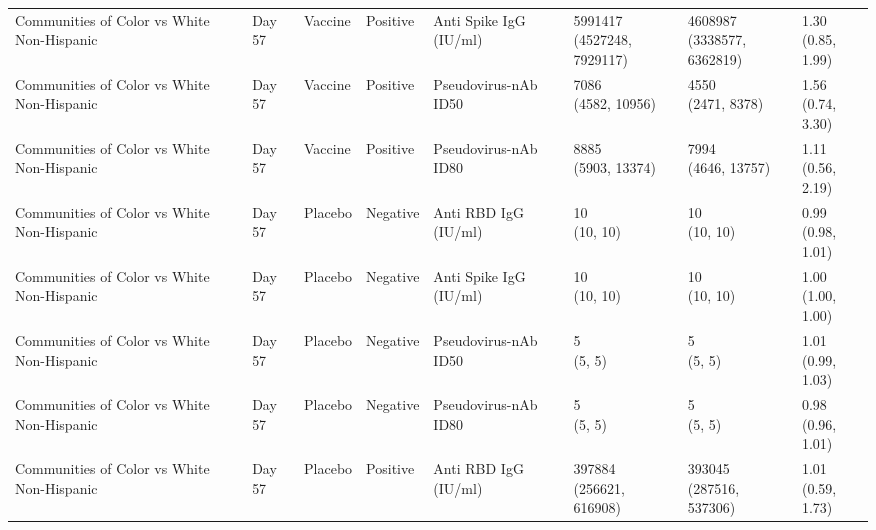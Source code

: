\documentclass[]{book}
\theoremstyle{definition}
\theoremstyle{definition}
\theoremstyle{definition}
\newcommand{\1}{\mathbbm{1}}
\begin{document}
\begin{landscape}
\begin{ThreePartTable}
\begin{longtable}[t]{>{\raggedright\arraybackslash}p{2.7cm}lllllll}
\addlinespace
Communities of Color vs White Non-Hispanic & Day 57 & Vaccine & Positive & Anti Spike IgG (IU/ml) & \makecell[l]{5991417\\(4527248, 7929117)} & \makecell[l]{4608987\\(3338577, 6362819)} & \makecell[l]{1.30\\(0.85, 1.99)}\\
Communities of Color vs White Non-Hispanic & Day 57 & Vaccine & Positive & Pseudovirus-nAb ID50 & \makecell[l]{7086\\(4582, 10956)} & \makecell[l]{4550\\(2471, 8378)} & \makecell[l]{1.56\\(0.74, 3.30)}\\
Communities of Color vs White Non-Hispanic & Day 57 & Vaccine & Positive & Pseudovirus-nAb ID80 & \makecell[l]{8885\\(5903, 13374)} & \makecell[l]{7994\\(4646, 13757)} & \makecell[l]{1.11\\(0.56, 2.19)}\\
Communities of Color vs White Non-Hispanic & Day 57 & Placebo & Negative & Anti RBD IgG (IU/ml) & \makecell[l]{10\\(10, 10)} & \makecell[l]{10\\(10, 10)} & \makecell[l]{0.99\\(0.98, 1.01)}\\
Communities of Color vs White Non-Hispanic & Day 57 & Placebo & Negative & Anti Spike IgG (IU/ml) & \makecell[l]{10\\(10, 10)} & \makecell[l]{10\\(10, 10)} & \makecell[l]{1.00\\(1.00, 1.00)}\\
\addlinespace
Communities of Color vs White Non-Hispanic & Day 57 & Placebo & Negative & Pseudovirus-nAb ID50 & \makecell[l]{5\\(5, 5)} & \makecell[l]{5\\(5, 5)} & \makecell[l]{1.01\\(0.99, 1.03)}\\
Communities of Color vs White Non-Hispanic & Day 57 & Placebo & Negative & Pseudovirus-nAb ID80 & \makecell[l]{5\\(5, 5)} & \makecell[l]{5\\(5, 5)} & \makecell[l]{0.98\\(0.96, 1.01)}\\
Communities of Color vs White Non-Hispanic & Day 57 & Placebo & Positive & Anti RBD IgG (IU/ml) & \makecell[l]{397884\\(256621, 616908)} & \makecell[l]{393045\\(287516, 537306)} & \makecell[l]{1.01\\(0.59, 1.73)}\\

\end{longtable}
\end{ThreePartTable}
\end{landscape}
\end{document}
